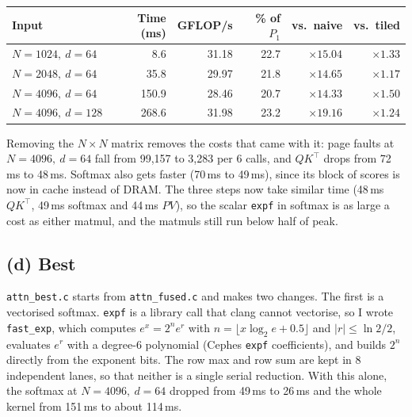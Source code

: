 \documentclass[11pt,a4paper]{article}
\begin{document}
\begin{center}
\begin{tabular}{@{}lrrrrr@{}}
\toprule
Input & Time (ms) & GFLOP/s & \% of $P_1$ & vs.\ naive & vs.\ tiled \\
\midrule
$N=1024,\ d=64$  & 8.6   & 31.18 & 22.7 & $\times15.04$ & $\times1.33$ \\
$N=2048,\ d=64$  & 35.8  & 29.97 & 21.8 & $\times14.65$ & $\times1.17$ \\
$N=4096,\ d=64$  & 150.9 & 28.46 & 20.7 & $\times14.33$ & $\times1.50$ \\
$N=4096,\ d=128$ & 268.6 & 31.98 & 23.2 & $\times19.16$ & $\times1.24$ \\
\bottomrule
\end{tabular}
\end{center}

Removing the $N \times N$ matrix removes the costs that came with it: page faults at
$N=4096,\ d=64$ fall from 99{,}157 to 3{,}283 per 6 calls, and $QK^\top$ drops from 72\,ms to
48\,ms. Softmax also gets faster (70\,ms to 49\,ms), since its block of scores is now in cache
instead of DRAM. The three steps now take similar time (48\,ms $QK^\top$, 49\,ms softmax and
44\,ms $PV$), so the scalar \texttt{expf} in softmax is as large a cost as either matmul, and
the matmuls still run below half of peak.

\subsection*{(d) Best}

\texttt{attn\_best.c} starts from \texttt{attn\_fused.c} and makes two changes. The first is a
vectorised softmax. \texttt{expf} is a library call that clang cannot vectorise, so I wrote
\texttt{fast\_exp}, which computes $e^x = 2^n e^r$ with $n = \lfloor x\log_2 e + 0.5\rfloor$
and $|r| \le \ln 2/2$, evaluates $e^r$ with a degree-6 polynomial (Cephes \texttt{expf}
coefficients), and builds $2^n$ directly from the exponent bits. The row max and row sum are
kept in 8 independent lanes, so that neither is a single serial reduction. With this alone, the
softmax at $N=4096,\ d=64$ dropped from 49\,ms to 26\,ms and the whole kernel from 151\,ms to
about 114\,ms.
\end{document}
